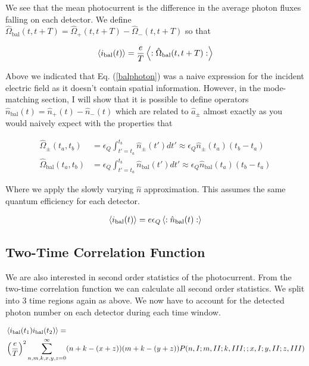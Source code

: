 \documentclass[12pt]{article}
\begin{document}
We see that the mean photocurrent is the difference in the average photon fluxes falling on each detector. We define $\hat{\Omega}_{\text{bal}}(t,t+T) = \hat{\Omega}_+(t,t+T) - \hat{\Omega}_-(t,t+T)$ so that

\begin{align}
\Braket{i_{\text{bal}}(t)} = \frac{e}{T}\Braket{:\hat{\Omega}_{\text{bal}}(t,t+T):}
\end{align}

Above we indicated that Eq. (\ref{balphoton}) was a naive expression for the incident electric field as it doesn't contain spatial information. However, in the mode-matching section, I will show that it is possible to define operators $\hat{n}_{\text{bal}}(t) = \hat{n}_+(t) - \hat{n}_-(t)$ which are related to $\hat{a}_{\pm}$ almost exactly as you would naively expect with the properties that

\begin{align}
\hat{\Omega}_{\pm}(t_a,t_b) &= \epsilon_Q\int_{t'=t_a}^{t_b} \hat{n}_{\pm}(t') dt' \approx \epsilon_Q \hat{n}_{\pm}(t_a) (t_b-t_a)\\
\hat{\Omega}_{\text{bal}}(t_a,t_b) &= \epsilon_Q\int_{t'=t_a}^{t_b} \hat{n}_{\text{bal}}(t') dt' \approx \epsilon_Q \hat{n}_{\text{bal}}(t_a) (t_b-t_a)
\end{align}

Where we apply the slowly varying $\hat{n}$ approximation. This assumes the same quantum efficiency for each detector.

\begin{align}
\Braket{i_{\text{bal}}(t)} = e\epsilon_Q \Braket{:\hat{n}_{\text{bal}}(t):}
\end{align}

\subsection{Two-Time Correlation Function}

We are also interested in second order statistics of the photocurrent. From the two-time correlation function we can calculate all second order statistics. We split into 3 time regions again as above. We now have to account for the detected photon number on each detector during each time window.

\begin{align}
&\Braket{i_{\text{bal}}(t_1)i_{\text{bal}}(t_2)} =\\
&\left(\frac{e}{T}\right)^2 \sum_{n,m,k,x,y,z=0}^{\infty} (n+k-(x+z))(m+k-(y+z))P(n,I;m,II;k,III ;; x,I ; y,II ; z,III)
\end{align}
\end{document}
